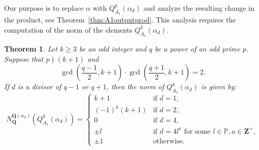 \documentclass{amsart}
\newcommand{\Q}{\mathbf Q}
\newcommand{\Z}{\mathbf Z}
\numberwithin{equation}{section}
\theoremstyle{plain}
\newtheorem{theorem}{Theorem}
\theoremstyle{definition}
\begin{document}
Our purpose is to replace $\alpha$ with $Q_{A_1}^k(\alpha_d)$ and analyze the resulting change in the  product, see Theorem~\ref{thm:A1outputprod}. This analysis requires the computation of the norm of the elements $Q_{A_1}^k(\alpha_d)$.

\begin{theorem}\label{thm:A1normQ}
Let $k\ge 3$ be an odd integer and $q$ be a power of an odd prime $p$. Suppose that $p\nmid(k+1)$ and $$\gcd\left(\frac{q-1}{2}, k+1\right) \cdot \gcd\left(\frac{q+1}{2}, k+1\right) = 2.$$
If $d$ is a divisor of $q-1$ or $q+1$, then the norm of $Q_{A_1}^k(\alpha_d)$ is given by:
	$$
	N_{\Q}^{\Q(\alpha_d)}\left(Q_{A_1}^k(\alpha_d)\right) = 
	\begin{cases} 
		k+1 & \text{if } d = 1, \\
		(-1)^k(k+1) & \text{if } d = 2, \\
		0 & \text{if } d = 4, \\
		\pm l & \text{if } d = 4l^a\text{ for some }l\in\mathbb{P}, a\in\Z^{+},\\
		\pm 1 & \text{otherwise}.
	\end{cases}
	$$
\end{theorem}
\end{document}

